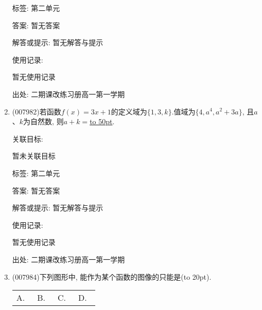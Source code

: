 \documentclass[10pt,a4paper]{article}
\newcommand{\blank}[1]{\underline{\hbox to #1pt{}}}
\newcommand{\bracket}[1]{(\hbox to #1pt{})}
\newcommand{\fourch}[4]{\par\begin{tabular}{p{.23\textwidth}p{.23\textwidth}p{.23\textwidth}p{.23\textwidth}}
A.~#1 &B.~#2& C.~#3& D.~#4
\end{tabular}}
\begin{document}
\begin{enumerate}[1.]
标签: 第二单元

答案: 暂无答案

解答或提示: 暂无解答与提示

使用记录:

暂无使用记录


出处: 二期课改练习册高一第一学期
\item { (007982)}若函数$f(x)=3x+1$的定义域为$\{1,3,k\}$.值域为$\{4,a^4,a^2+3a\}$, 且$a$、$k$为自然数, 则$a+k=$\blank{50}.


关联目标:

暂未关联目标



标签: 第二单元

答案: 暂无答案

解答或提示: 暂无解答与提示

使用记录:

暂无使用记录


出处: 二期课改练习册高一第一学期
\item { (007984)}下列图形中, 能作为某个函数的图像的只能是\bracket{20}.
\fourch{\begin{tikzpicture}[>=latex]
    \draw [->] (-1.5,0) -- (1.5,0) node [below] {$x$};
    \draw [->] (0,-1.5) -- (0,1.5) node [left] {$y$};
    \draw (0,0) node [below left] {$O$};
    \draw (1,0) node [below right] {$1$} (-1,0) node [below left] {$-1$} (0,1) node [above left] {$1$} (0,-1) node [below left] {$-1$};
    \draw (0,0) circle (1);
\end{tikzpicture}
}{\begin{tikzpicture}[>=latex]
    \draw [->] (-1.5,0) -- (1.5,0) node [below] {$x$};
    \draw [->] (0,-1.5) -- (0,1.5) node [left] {$y$};
    \draw (0,0) node [below left] {$O$};
    \draw (1,0) node [below right] {$1$} (0,1) node [above left] {$1$} (0,-1) node [below left] {$-1$};
    \draw (0,1) arc (90:-90:1);
\end{tikzpicture}}{\begin{tikzpicture}[>=latex]
    \draw [->] (-1.5,0) -- (1.5,0) node [below] {$x$};
    \draw [->] (0,-1.5) -- (0,1.5) node [left] {$y$};
    \draw (0,0) node [below left] {$O$};
    \draw (1,0) node [below right] {$1$} (0,1) node [above left] {$1$} (0,-1) node [below left] {$-1$} (-1,0) node [below left] {$-1$};
    \draw (0,1) arc (90:0:1) (0,-1) arc (270:180:1);
    \filldraw [fill = white, draw = black] (0,1) circle (0.05) (0,-1) circle (0.05);
\end{tikzpicture}}{\begin{tikzpicture}[>=latex]
    \draw [->] (-1.5,0) -- (1.5,0) node [below] {$x$};
    \draw [->] (0,-1.5) -- (0,1.5) node [left] {$y$};
    \draw (0,0) node [below left] {$O$};
    \draw (1,0) node [below right] {$1$} (0,1) node [above left] {$1$} (0,-1) node [below left] {$-1$} (-1,0) node [below left] {$-1$};
    \draw (0,1) arc (90:180:1) (0,-1) arc (270:360:1);
    \filldraw (0,1) circle (0.05) (0,-1) circle (0.05) (1,0) circle (0.05) (-1,0) circle (0.05);
\end{tikzpicture}}



\end{enumerate}
\end{document}

